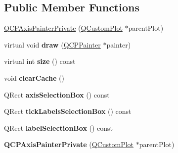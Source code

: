 \subsection*{Public Member Functions}
\begin{DoxyCompactItemize}
\item 
\hyperlink{class_q_c_p_axis_painter_private_a0f14aa5c4aa83dbcd68984a7c73bf94f}{Q\+C\+P\+Axis\+Painter\+Private} (\hyperlink{class_q_custom_plot}{Q\+Custom\+Plot} $\ast$parent\+Plot)
\item 
\mbox{\label{class_q_c_p_axis_painter_private_a0207a99bdf9c4f70af20928898ddc2fc}} 
virtual void {\bfseries draw} (\hyperlink{class_q_c_p_painter}{Q\+C\+P\+Painter} $\ast$painter)
\item 
\mbox{\label{class_q_c_p_axis_painter_private_a60fc2eec99ed23e9a3c98e8f7e5730b0}} 
virtual int {\bfseries size} () const
\item 
\mbox{\label{class_q_c_p_axis_painter_private_a7b6806e32c44384fd0ae4dcdaa72b1b5}} 
void {\bfseries clear\+Cache} ()
\item 
\mbox{\label{class_q_c_p_axis_painter_private_ab29635564acb5d0012fa9e297477db05}} 
Q\+Rect {\bfseries axis\+Selection\+Box} () const
\item 
\mbox{\label{class_q_c_p_axis_painter_private_acf8a4fef47cec70b596fe20941aa5b16}} 
Q\+Rect {\bfseries tick\+Labels\+Selection\+Box} () const
\item 
\mbox{\label{class_q_c_p_axis_painter_private_ae7800667d15867040ada5f4bf027f070}} 
Q\+Rect {\bfseries label\+Selection\+Box} () const
\item 
\mbox{\label{class_q_c_p_axis_painter_private_a0f14aa5c4aa83dbcd68984a7c73bf94f}} 
{\bfseries Q\+C\+P\+Axis\+Painter\+Private} (\hyperlink{class_q_custom_plot}{Q\+Custom\+Plot} $\ast$parent\+Plot)
\item 
\mbox{\label{class_q_c_p_axis_painter_private_a73d5da6d2296825fcf3134dc688510c7}} 

\end{DoxyCompactItemize}
